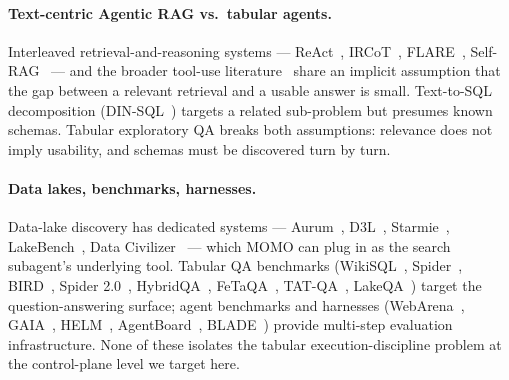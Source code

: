 \paragraph{Text-centric Agentic RAG vs.\ tabular agents.} Interleaved retrieval-and-reasoning systems --- ReAct~\cite{yao2023react}, IRCoT~\cite{trivedi2023ircot}, FLARE~\cite{jiang2023flare}, Self-RAG~\cite{asai2024selfrag} --- and the broader tool-use literature~\cite{schick2023toolformer,qin2024toolllm} share an implicit assumption that the gap between a relevant retrieval and a usable answer is small. Text-to-SQL decomposition (DIN-SQL~\cite{pourreza2023dinsql}) targets a related sub-problem but presumes known schemas. Tabular exploratory QA breaks both assumptions: relevance does not imply usability, and schemas must be discovered turn by turn.

\paragraph{Data lakes, benchmarks, harnesses.} Data-lake discovery has dedicated systems --- Aurum~\cite{fernandez2018aurum}, D3L~\cite{bogatu2020d3l}, Starmie~\cite{fan2023starmie}, LakeBench~\cite{chai2024lakebench}, Data Civilizer~\cite{deng2017datacivilizer} --- which MOMO can plug in as the search subagent's underlying tool. Tabular QA benchmarks (WikiSQL~\cite{zhong2017seq2sql}, Spider~\cite{yu2018spider}, BIRD~\cite{li2023bird}, Spider 2.0~\cite{lei2024spider2}, HybridQA~\cite{chen2020hybridqa}, FeTaQA~\cite{nan2022fetaqa}, TAT-QA~\cite{zhu2021tatqa}, LakeQA~\cite{wang2026lakeqa}) target the question-answering surface; agent benchmarks and harnesses (WebArena~\cite{zhou2024webarena}, GAIA~\cite{mialon2023gaia}, HELM~\cite{liang2022helm}, AgentBoard~\cite{liu2024agentboard}, BLADE~\cite{gu2024blade}) provide multi-step evaluation infrastructure. None of these isolates the tabular execution-discipline problem at the control-plane level we target here.
